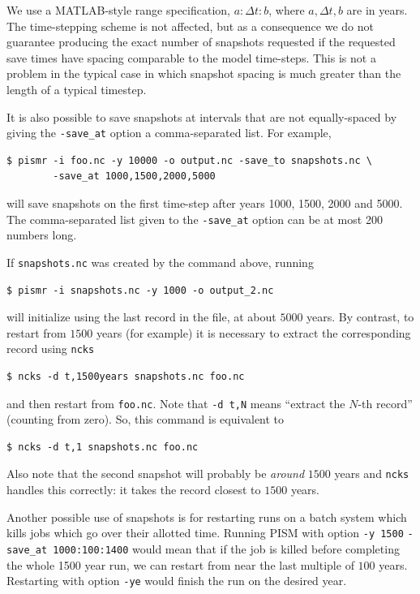 \documentclass[11pt,final]{amsart}
\newcommand{\pismoptionindex}[1]{\index{options for PISM (and PETSc)!\texttt{-#1}}}
\newcommand{\intextoption}[1]{\texttt{-#1}\pismoptionindex{#1}}
\begin{document}
We use a MATLAB-style range specification, $a:\Delta t:b$, where $a,\Delta t,b$ are in years.  The time-stepping scheme is not affected, but as a consequence we do not guarantee producing the exact number of snapshots requested if the requested save times have spacing comparable to the model time-steps.  This is not a problem in the typical case in which snapshot spacing is much greater than the length of a typical timestep.

It is also possible to save snapshots at intervals that are not equally-spaced
by giving the \verb|-save_at| option a comma-separated list. For example,
\begin{verbatim}
$ pismr -i foo.nc -y 10000 -o output.nc -save_to snapshots.nc \
        -save_at 1000,1500,2000,5000
\end{verbatim}
will save snapshots on the first time-step after years 1000, 1500, 2000 and 5000.
The comma-separated list given to the \verb|-save_at| option can be at most 200 numbers long.

If \verb|snapshots.nc| was created by the command above, running
\begin{verbatim}
$ pismr -i snapshots.nc -y 1000 -o output_2.nc
\end{verbatim}
will initialize using the last record in the file, at about $5000$ years.  By contrast, to restart from $1500$ years (for example) it is necessary to extract the corresponding record using \verb|ncks|
\begin{verbatim}
$ ncks -d t,1500years snapshots.nc foo.nc
\end{verbatim}
and then restart from \verb|foo.nc|.  Note that \verb|-d t,N| means ``extract the $N$-th record'' (counting from zero).  So, this command is equivalent to
\begin{verbatim}
$ ncks -d t,1 snapshots.nc foo.nc
\end{verbatim}
Also note that the second snapshot will probably be \emph{around} $1500$ years and \verb|ncks| handles this correctly: it takes the record closest to $1500$ years.

Another possible use of snapshots is for restarting runs on a batch system which kills jobs which go over their allotted time.  Running PISM with option \verb|-y 1500| \verb|-save_at 1000:100:1400| would mean that if the job is killed before completing the whole 1500 year run, we can restart from near the last multiple of $100$ years.  Restarting with option \intextoption{ye} would finish the run on the desired year.
\end{document}
